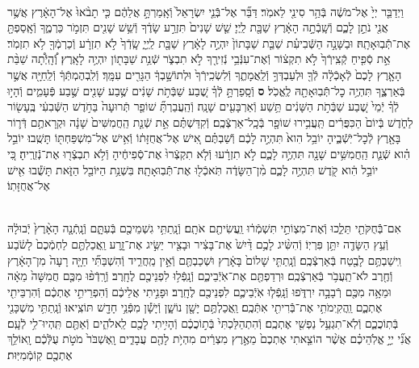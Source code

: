 \documentclass[twoside, openany, parskip=half, 11pt]{book}
\begin{document}
\begin{sometimes}
\begin{footnotesize}
\begin{multicols}{2}
\\
וַיְדַבֵּ֤ר יְיָ֙ אֶל־מֹשֶׁ֔ה בְּֿהַ֥ר סִינַ֖י לֵאמֹֽר׃ דַּבֵּ֞ר אֶל־בְּֿֿנֵ֤י יִשְׂרָאֵל֙ וְֿאָֽמַרְתָּ֣ אֲלֵהֶ֔ם כִּ֤י תָבֹ֨אוּ֙ אֶל־הָאָ֔רֶץ אֲשֶׁ֥ר אֲנִ֖י נֹתֵ֣ן לָכֶ֑ם וְֿשָֽׁבְֿתָ֣ה הָאָ֔רֶץ שַׁבָּ֖ת לַֽיְיָ׃ שֵׁ֤שׁ שָׁנִים֙ תִּזְרַ֣ע שָׂדֶ֔ךָ וְֿשֵׁ֥שׁ שָׁנִ֖ים תִּזְמֹ֣ר כַּרְמֶ֑ךָ וְֿאָֽסַפְתָּ֖ אֶת־תְּֿֿבֽוּאָתָֽהּ׃  וּבַשָּׁנָ֣ה הַשְּֿׁבִיעִ֗ת שַׁבַּ֤ת שַׁבָּתוֹן֙ יִהְיֶ֣ה לָאָ֔רֶץ שַׁבָּ֖ת לַֽיְיָ֑ שָֽׂדְֿךָ֙ לֹ֣א תִזְרָ֔ע וְֿכַרְמְֿךָ֖ לֹ֥א תִזְמֹֽר׃ אֵ֣ת סְֿפִ֤יחַ קְֿצִֽירְֿךָ֙ לֹ֣א תִקְצ֔וֹר וְֿאֶת־עִנְּֿבֵ֥י נְֿזִירֶ֖ךָ לֹ֣א תִבְצֹ֑ר שְֿׁנַ֥ת שַׁבָּת֖וֹן יִהְיֶ֥ה לָאָֽרֶץ׃ וְֽֿ֠הָֽיְֿתָ֠ה שַׁבַּ֨ת הָאָ֤רֶץ לָכֶם֙ לְֿאָכְֿלָ֔ה לְֿךָ֖ וּלְעַבְדְּךָ֣ וְֿלַֽאֲמָתֶ֑ךָ וְֿלִשְׂכִֽירְֿךָ֙ וּלְתוֹשָׁ֣בְךָ֔ הַגָּרִ֖ים עִמָּֽךְ׃ וְֿלִֽבְהֶמְתְּֿךָ֔ וְֿלַֽחַיָּ֖ה אֲשֶׁ֣ר בְּֿאַרְצֶ֑ךָ תִּהְיֶ֥ה כׇל־תְּֿֿבֽוּאָתָ֖הּ לֶֽאֱכֹֽל׃ \textbf{ס}  וְֿסָֽפַרְתָּ֣ לְֿךָ֗ שֶׁ֚בַע שַׁבְּֿתֹ֣ת שָׁנִ֔ים שֶׁ֥בַע שָׁנִ֖ים שֶׁ֣בַע פְּֿעָמִ֑ים וְֿהָי֣וּ לְֿךָ֗ יְֿמֵי֙ שֶׁ֚בַע שַׁבְּֿתֹ֣ת הַשָּׁנִ֔ים תֵּ֥שַׁע וְֿאַרְבָּעִ֖ים שָׁנָֽה׃ וְֿהַֽעֲבַרְתָּ֞ שׁוֹפַ֤ר תְּֿרוּעָה֙ בַּחֹ֣דֶשׁ הַשְּֿׁבִעִ֔י בֶּֽעָשׂ֖וֹר לַחֹ֑דֶשׁ בְּֿיוֹם֙ הַכִּפֻּרִ֔ים תַּֽעֲבִ֥ירוּ שׁוֹפָ֖ר בְּֿכָֽל־אַרְצְֿכֶֽם׃ וְֿקִדַּשְׁתֶּ֗ם אֵ֣ת שְֿׁנַ֤ת הַֽחֲמִשִּׁים֙ שָׁנָ֔ה וּקְרָאתֶ֥ם דְּֿר֛וֹר בָּאָ֖רֶץ לְֿכׇל־יֹֽשְֿׁבֶ֑יהָ יוֹבֵ֥ל הִוא֙ תִּהְיֶ֣ה לָכֶ֔ם וְֿשַׁבְתֶּ֗ם אִ֚ישׁ אֶל־אֲחֻזָּת֔וֹ וְֿאִ֥ישׁ אֶל־מִשְׁפַּחְתּ֖וֹ תָּשֻֽׁבוּ׃ יוֹבֵ֣ל הִ֗וא שְֿׁנַ֛ת הַֽחֲמִשִּׁ֥ים שָׁנָ֖ה תִּהְיֶ֣ה לָכֶ֑ם לֹ֣א תִזְרָ֔עוּ וְֿלֹ֤א תִקְצְֿרוּ֙ אֶת־סְֿפִיחֶ֔יהָ וְֿלֹ֥א תִבְצְֿר֖וּ אֶת־נְֿזִרֶֽיהָ׃ כִּ֚י יוֹבֵ֣ל הִ֔וא קֹ֖דֶשׁ תִּהְיֶ֣ה לָכֶ֑ם מִ֨ן־הַשָּׂדֶ֔ה תֹּֽאכְֿל֖וּ אֶת־תְּֿֿבֽוּאָתָֽהּ׃ בִּשְׁנַ֥ת הַיּוֹבֵ֖ל הַזֹּ֑את תָּשֻׁ֕בוּ אִ֖ישׁ אֶל־אֲחֻזָּתֽוֹ׃


\\
אִם־בְּֿֿחֻקֹּתַ֖י תֵּלֵ֑כוּ וְֿאֶת־מִצְוֹתַ֣י תִּשְׁמְֿר֔וּ וַֽעֲשִׂיתֶ֖ם אֹתָֽם׃ וְֿנָֽתַתִּ֥י גִשְׁמֵיכֶ֖ם בְּֿעִתָּ֑ם וְֿנָֽתְֿנָ֤ה הָאָ֨רֶץ֙ יְֿבוּלָ֔הּ וְֿעֵ֥ץ הַשָּׂדֶ֖ה יִתֵּ֥ן פִּרְיֽוֹ׃ וְֿהִשִּׂ֨יג לָכֶ֥ם דַּ֨יִשׁ֙ אֶת־בָּצִ֔יר וּבָצִ֖יר יַשִּׂ֣יג אֶת־זָ֑רַע וַֽאֲכַלְתֶּ֤ם לַחְמְֿכֶם֙ לָשֹׂ֔בַע וִֽישַׁבְתֶּ֥ם לָבֶ֖טַח בְּֿאַרְצְֿכֶֽם׃  וְֿנָֽתַתִּ֤י שָׁלוֹם֙ בָּאָ֔רֶץ וּשְׁכַבְתֶּ֖ם וְֿאֵ֣ין מַֽחֲרִ֑יד וְֿהִשְׁבַּתִּ֞י חַיָּ֤ה רָעָה֙ מִן־הָאָ֔רֶץ וְֿחֶ֖רֶב לֹא־תַֽעֲבֹ֥ר בְּֿאַרְצְֿכֶֽם׃ וּרְדַפְתֶּ֖ם אֶת־אֹֽיְֿבֵיכֶ֑ם וְֿנָֽפְֿל֥וּ לִפְנֵיכֶ֖ם לֶחָֽרֶב׃ וְֿרָֽדְֿפ֨וּ מִכֶּ֤ם חֲמִשָּׁה֙ מֵאָ֔ה וּמֵאָ֥ה מִכֶּ֖ם רְֿבָבָ֣ה יִרְדֹּ֑פוּ וְֿנָֽפְֿל֧וּ אֹֽיְֿבֵיכֶ֛ם לִפְנֵיכֶ֖ם לֶחָֽרֶב׃ וּפָנִ֣יתִי אֲלֵיכֶ֔ם וְֿהִפְרֵיתִ֣י אֶתְכֶ֔ם וְֿהִרְבֵּיתִ֖י אֶתְכֶ֑ם וַֽהֲקִֽימֹתִ֥י אֶת־בְּֿֿרִיתִ֖י אִתְּֿכֶֽם׃  וַֽאֲכַלְתֶּ֥ם יָשָׁ֖ן נוֹשָׁ֑ן וְֿיָשָׁ֕ן מִפְּֿנֵ֥י חָדָ֖שׁ תּוֹצִֽיאוּ׃ וְֿנָֽתַתִּ֥י מִשְׁכָּנִ֖י בְּֿתֽוֹכֲכֶ֑ם וְֿלֹֽא־תִגְעַ֥ל נַפְשִׁ֖י אֶתְכֶֽם׃ וְֿהִתְהַלַּכְתִּי֙ בְּֿת֣וֹכֲכֶ֔ם וְֿהָיִ֥יתִי לָכֶ֖ם לֵֽאלֹהִ֑ים וְֿאַתֶּ֖ם תִּֽהְיוּ־לִ֥י לְֿעָֽם׃ אֲנִ֞י יְיָ֣ אֱלֹֽהֵיכֶ֗ם אֲשֶׁ֨ר הוֹצֵ֤אתִי אֶתְכֶם֙ מֵאֶ֣רֶץ מִצְרַ֔יִם מִהְיֹ֥ת לָהֶ֖ם עֲבָדִ֑ים וָֽאֶשְׁבֹּר֙ מֹטֹ֣ת עֻלְּֿכֶ֔ם וָֽאוֹלֵ֥ךְ אֶתְכֶ֖ם קֽוֹמְֿמִיּֽוּת׃


\end{multicols}
\end{footnotesize}
\end{sometimes}
\end{document}
